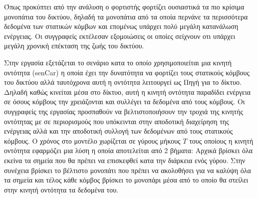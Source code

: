 Όπως προκύπτει από την ανάλυση ο φορτιστής φορτίζει ουσιαστικά τα πιο κρίσιμα μονοπάτια του δικτύου, δηλαδή τα μονοπάτια από τα οποία περνάνε τα περισσότερα δεδομένα
των στατικών κόμβων και επομένως υπάρχει πολύ μεγάλη κατανάλωση ενέργειας. Οι συγγραφείς εκτέλεσαν εξομοιώσεις οι οποίες σείχνουν οτι υπάρχει μεγάλη χρονική επέκταση
της ζωής του δικτύου.


Στην εργασία \cite{yuanyuan_joint} εξετάζεται το σενάριο κατα το οποίο χρησιμοποιείται μια κινητή οντότητα (senCar) η οποία έχει την δυνατότητα να φορτίζει τους
στατικούς κόμβους του δικτύου αλλά ταυτόχρονα αυτή η οντότητα λειτουργεί ως Πηγή για το δίκτυο. Δηλαδή καθώς κινείται μέσα στο δίκτυο, αυτή η κινητή οντότητα
παραδίδει ενέργεια σε όσους κόμβους την χρειάζονται και συλλέγει τα δεδομένα από τους κόμβους. Οι συγγραφείς της εργασίας προσπαθούν να βελτιστοποιήσουν την τροχιά
της κινητής οντότητας με σε περιορισμούς που υπόκεινται στην αποδοτική διαχείρηση της ενέργειας αλλά και την αποδοτική συλλογή των δεδομένων από τους στατικούς
κόμβους. Ο χρόνος στο μοντέλο χωρίζεται σε γύρους μήκους $T$ τους οποίους η κινητή οντότητα εφαρμόζει μια λύση η οποία αποτελείται από 2 βήματα: Αρχικά βρίσκει όλα
εκείνα τα σημεία που θα πρέπει να επισκεφθεί κατα την διάρκεια ενός γύρου. Στην συνέχεια βρίσκει το βέλτιστο μονοπάτι που πρέπει να ακολοθήσει για να καλύψη όλα τα
σημεία και τέλος κάθε κόμβος βρίσκει το μονοπάρι μέσα από το οποίο θα στείλει στην κινητή οντότητα τα δεδομένα του.

